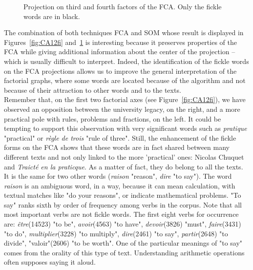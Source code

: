\documentclass[preprint]{elsarticle}
\begin{document}
\begin{figure}[h!]
\caption{Projection on third and fourth factors of the FCA. Only the fickle words are in black.}
\label{fig:CA34fi}
\end{figure}

The combination of both techniques FCA and SOM whose result is displayed in Figures~\ref{fig:CA12fi} and~\ref{fig:CA34fi} is interesting because it preserves properties of the FCA while giving additional information about the center of the projection -- which is usually difficult to interpret. Indeed, the identification  of the fickle words on the FCA projections allows us to improve the general interpretation of the factorial graphs, where some words are located because of the algorithm and not because of their attraction to other words and to the texts.\\

Remember that, on the first two factorial axes (see Figure~\ref{fig:CA12fi}), we have observed an opposition between the university legacy, on the right, and a more practical pole with rules, problems and fractions, on the left. It could be tempting to support this observation with very significant words such as \textit{pratique} "practical" or \textit{règle de trois} "rule of three". Still, the enhancement of the fickle forms on the FCA shows that these words are in fact shared between many different texts and not only linked to the more 'practical' ones: Nicolas Chuquet and \textit{Traict\'e en la praticque}. As a matter of fact, they do belong to all the texts.\\ 

It is the same for two other words (\textit{raison} "reason", \textit{dire} "to say"). The word \textit{raison} is an ambiguous word, in a way, because it can mean calculation, with textual matches like "do your reasons", or indicate mathematical problems. "To say" ranks sixth by order of frequency among verbs in the corpus. 
Note that all most important verbs are not fickle words. The first eight verbs for occurrence are: \textit{être}(14523) "to be", \textit{avoir}(4563) "to have", \textit{devoir}(3826) "must", \textit{faire}(3431) "to do", \textit{multiplier}(3228) "to multiply", \textit{dire}(2461) "to say", \textit{partir}(2648) "to divide", "valoir"(2606) "to be worth". One of the particular meanings of "to say" comes from the orality of this type of text. Understanding arithmetic operations often supposes saying it aloud.\\
\end{document}
